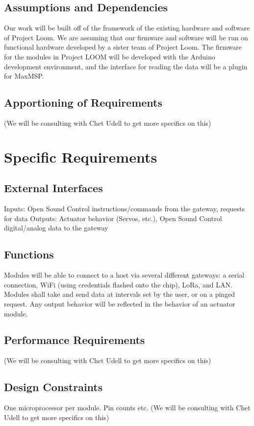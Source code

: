 \documentclass[onecolumn, draftclsnofoot,10pt, compsoc]{IEEEtran}
\begin{document}
	\subsection{Assumptions and Dependencies}
	Our work will be built off of the framework of the existing hardware and software of Project Loom. We are assuming that our firmware and software will be run on functional hardware developed by a sister team of Project Loom. The firmware for the modules in Project LOOM will be developed with the Arduino development environment, and the interface for reading the data will be a plugin for MaxMSP.

	\subsection{Apportioning of Requirements}
	(We will be consulting with Chet Udell to get more specifics on this)

\section{Specific Requirements}
\subsection{External Interfaces}
Inputs: Open Sound Control instructions/commands from the gateway, requests for data
Outputs: Actuator behavior (Servos, etc.), Open Sound Control digital/analog data to the gateway

\subsection{Functions}
Modules will be able to connect to a host via several different gateways: a serial connection, WiFi (using credentials flashed onto the chip), LoRa, and LAN. Modules shall take and send data at intervals set by the user, or on a pinged request. Any output behavior will be reflected in the behavior of an actuator module.

\subsection{Performance Requirements}
(We will be consulting with Chet Udell to get more specifics on this)

\subsection{Design Constraints}
One microprocessor per module. Pin counts etc.
(We will be consulting with Chet Udell to get more specifics on this)
\end{document}
